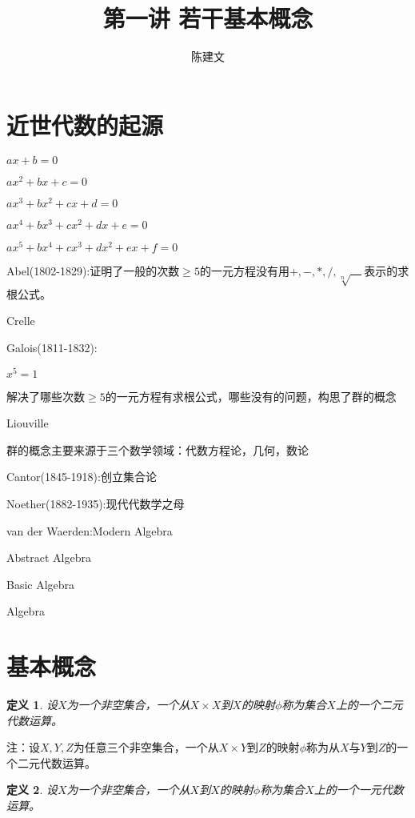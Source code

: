 \documentclass{article}
\newtheorem{Def}{定义}
\begin{document}
\begin{CJK*}{UTF8}{gbsn}
  \title{第一讲 若干基本概念}
  \author{陈建文}
  \maketitle
  

\section{近世代数的起源}


$ax+b=0$

$ax^2+bx+c=0$

$ax^3+bx^2+cx+d=0$

$ax^4+bx^3+cx^2+dx+e=0$

$ax^5+bx^4+cx^3+dx^2+ex+f=0$

Abel(1802-1829):证明了一般的次数$\geq 5$的一元方程没有用$+,-,*,/,\sqrt[n]{\quad}$表示的求根公式。

Crelle

Galois(1811-1832):

$x^5=1$

解决了哪些次数$\geq 5$的一元方程有求根公式，哪些没有的问题，构思了群的概念

Liouville

群的概念主要来源于三个数学领域：代数方程论，几何，数论

Cantor(1845-1918):创立集合论

Noether(1882-1935):现代代数学之母

van der Waerden:Modern Algebra

Abstract Algebra

Basic Algebra

Algebra



\section{基本概念}
\begin{Def}
  设$X$为一个非空集合，一个从$X\times X$到$X$的映射$\phi$称为集合$X$上的一个二元代数运算。
\end{Def}
  
注：设$X,Y,Z$为任意三个非空集合，一个从$X\times Y$到$Z$的映射$\phi$称为从$X$与$Y$到$Z$的一个二元代数运算。

\begin{Def}
  设$X$为一个非空集合，一个从$X$到$X$的映射$\phi$称为集合$X$上的一个一元代数运算。
\end{Def}


\end{CJK*}
\end{document}
